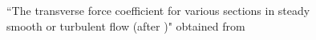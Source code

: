 \begin{figure}
	
  \setlength{\unitlength}{\textwidth}

  \caption{ ``The transverse force coefficient for various sections in steady smooth or turbulent flow (after \citet{Blevins1990})" obtained from \citet{Paidoussis2010}}
    \label{fig:par_diff_cross_sec}
\end{figure}

